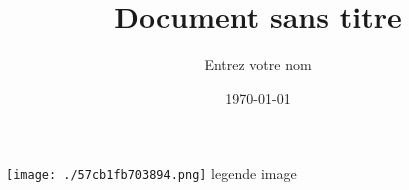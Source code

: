 \documentclass[a4paper]{article}
\title{Document sans titre}
\author{Entrez votre nom}
\date{\today}
\begin{document}
\maketitle
\newpage
\texttt{[image: ./57cb1fb703894.png]}
legende image
~\\
\end{document}
